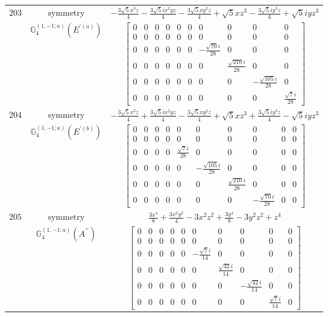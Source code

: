 \documentclass[fleqn,8pt,landscape]{jsarticle}
\begin{document}
\begin{longtable}{ccc}
$ 203 $ & $ \text{symmetry} $ & $ - \frac{3 \sqrt{5} x^{3} z}{4} - \frac{3 \sqrt{5} i x^{2} y z}{4} - \frac{3 \sqrt{5} x y^{2} z}{4} + \sqrt{5} x z^{3} - \frac{3 \sqrt{5} i y^{3} z}{4} + \sqrt{5} i y z^{3} $ \\
$  $ & $ \mathbb{G}_{4}^{(1,-1;a)}(E^{\prime(a)}) $ & $ \begin{bmatrix} 0 & 0 & 0 & 0 & 0 & 0 & 0 & 0 & 0 & 0 \\ 0 & 0 & 0 & 0 & 0 & 0 & 0 & 0 & 0 & 0 \\ 0 & 0 & 0 & 0 & 0 & 0 & - \frac{\sqrt{70} i}{28} & 0 & 0 & 0 \\ 0 & 0 & 0 & 0 & 0 & 0 & 0 & \frac{\sqrt{210} i}{28} & 0 & 0 \\ 0 & 0 & 0 & 0 & 0 & 0 & 0 & 0 & - \frac{\sqrt{105} i}{28} & 0 \\ 0 & 0 & 0 & 0 & 0 & 0 & 0 & 0 & 0 & \frac{\sqrt{7} i}{28} \end{bmatrix} $ \\ \hline
$ 204 $ & $ \text{symmetry} $ & $ - \frac{3 \sqrt{5} x^{3} z}{4} + \frac{3 \sqrt{5} i x^{2} y z}{4} - \frac{3 \sqrt{5} x y^{2} z}{4} + \sqrt{5} x z^{3} + \frac{3 \sqrt{5} i y^{3} z}{4} - \sqrt{5} i y z^{3} $ \\
$  $ & $ \mathbb{G}_{4}^{(1,-1;a)}(E^{\prime(b)}) $ & $ \begin{bmatrix} 0 & 0 & 0 & 0 & 0 & 0 & 0 & 0 & 0 & 0 \\ 0 & 0 & 0 & 0 & 0 & 0 & 0 & 0 & 0 & 0 \\ 0 & 0 & 0 & 0 & \frac{\sqrt{7} i}{28} & 0 & 0 & 0 & 0 & 0 \\ 0 & 0 & 0 & 0 & 0 & - \frac{\sqrt{105} i}{28} & 0 & 0 & 0 & 0 \\ 0 & 0 & 0 & 0 & 0 & 0 & \frac{\sqrt{210} i}{28} & 0 & 0 & 0 \\ 0 & 0 & 0 & 0 & 0 & 0 & 0 & - \frac{\sqrt{70} i}{28} & 0 & 0 \end{bmatrix} $ \\ \hline
$ 205 $ & $ \text{symmetry} $ & $ \frac{3 x^{4}}{8} + \frac{3 x^{2} y^{2}}{4} - 3 x^{2} z^{2} + \frac{3 y^{4}}{8} - 3 y^{2} z^{2} + z^{4} $ \\
$  $ & $ \mathbb{G}_{4}^{(1,-1;a)}(A^{\prime\prime}) $ & $ \begin{bmatrix} 0 & 0 & 0 & 0 & 0 & 0 & 0 & 0 & 0 & 0 \\ 0 & 0 & 0 & 0 & 0 & 0 & 0 & 0 & 0 & 0 \\ 0 & 0 & 0 & 0 & 0 & - \frac{\sqrt{7} i}{14} & 0 & 0 & 0 & 0 \\ 0 & 0 & 0 & 0 & 0 & 0 & \frac{\sqrt{42} i}{14} & 0 & 0 & 0 \\ 0 & 0 & 0 & 0 & 0 & 0 & 0 & - \frac{\sqrt{42} i}{14} & 0 & 0 \\ 0 & 0 & 0 & 0 & 0 & 0 & 0 & 0 & \frac{\sqrt{7} i}{14} & 0 \end{bmatrix} $ \\ \hline

\end{longtable}
\end{document}
